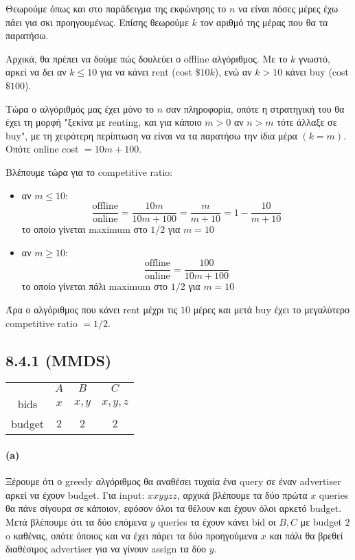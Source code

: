 \documentclass[a4paper,11pt]{article}
\begin{document}
Θεωρούμε όπως και στο παράδειγμα της εκφώνησης το $n$ να είναι πόσες μέρες έχω πάει για σκι προηγουμένως.
Επίσης θεωρούμε $k$ τον αριθμό της μέρας που θα τα παρατήσω.

Αρχικά, θα πρέπει να δούμε πώς δουλεύει ο offline αλγόριθμος.
Με το $k$ γνωστό, αρκεί να δει αν $k \leq 10$ για να κάνει rent (cost $\$10k$), ενώ αν $k > 10$ κάνει buy (cost $\$100$).

Τώρα ο αλγόριθμός μας έχει μόνο το $n$ σαν πληροφορία, οπότε η στρατηγική του θα έχει τη μορφή "ξεκίνα με renting, και για κάποιο $m>0$ αν $n>m$ τότε άλλαξε σε buy", με τη χειρότερη περίπτωση να είναι να τα παρατήσω την ίδια μέρα $(k=m)$.
Οπότε online cost $=10m+100$.

Βλέπουμε τώρα για το competitive ratio:
\begin{itemize}
	\item αν $m \leq 10$:
		\[
			\frac{\text{offline}}{\text{online}} = \frac{10m}{10m+100} = \frac{m}{m+10} = 1 - \frac{10}{m+10}
		\]
		το οποίο γίνεται maximum στο $1/2$ για $m=10$
	\item αν $m \geq 10$:
		\[
			\frac{\text{offline}}{\text{online}} = \frac{100}{10m+100}
		\]
		το οποίο γίνεται πάλι maximum στο $1/2$ για $m=10$
\end{itemize}
Άρα ο αλγόριθμος που κάνει rent μέχρι τις $10$ μέρες και μετά buy έχει το μεγαλύτερο competitive ratio $=1/2$.

\subsection*{8.4.1 (MMDS)}

\begin{center}
	\begin{tabular}{| c || c | c | c |}
		\hline
		& $A$ & $B$ & $C$ \\ \hhline{|=#=|=|=|}
		bids & $x$ & $x,y$ & $x,y,z$ \\ \hline
		budget & $2$ & $2$ & $2$ \\ \hline
	\end{tabular}
\end{center}

\paragraph{(a)} Ξέρουμε ότι ο greedy αλγόριθμος θα αναθέσει τυχαία ένα query σε έναν advertiser αρκεί να έχουν budget.
Για input: $xxyyzz$, αρχικά βλέπουμε τα δύο πρώτα $x$ queries θα πάνε σίγουρα σε κάποιον, εφόσον όλοι τα θέλουν και έχουν όλοι αρκετό budget.
Μετά βλέπουμε ότι τα δύο επόμενα $y$ queries τα έχουν κάνει bid οι $B,C$ με budget $2$ o καθένας, οπότε όποιος και να έχει πάρει τα δύο προηγούμενα $x$ και πάλι θα βρεθεί διαθέσιμος advertiser για να γίνουν assign τα δύο $y$.
\end{document}
